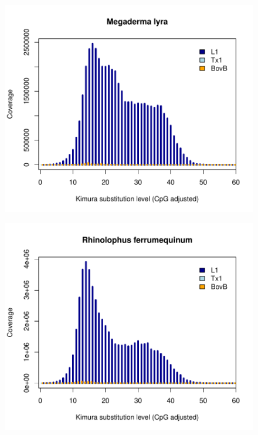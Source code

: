 \documentclass[12pt,a4paper,times]{article}
\begin{document}
\begin{figure}[H]
	\centering
	\includegraphics[scale=0.8]{suppFigures/divergencePlots/Megaderma_lyra.pdf}
	\caption{\label{Megaderma_lyra}}
\end{figure}

\begin{figure}[H]
	\centering
	\includegraphics[scale=0.8]{suppFigures/divergencePlots/Rhinolophus_ferrumequinum.pdf}
	\caption{\label{Rhinolophus_ferrumequinum}}
\end{figure}
\end{document}
